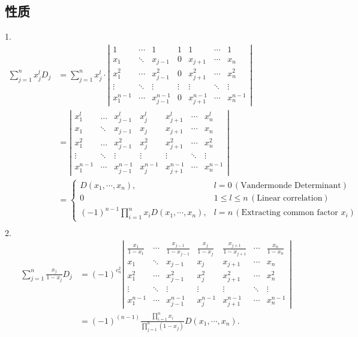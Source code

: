 \subsection{性质}
1.
\[\begin{aligned}
    \sum_{j=1}^n x_j^{l} D_j &=\sum_{j=1}^n x_j^{l} \cdot\left|\begin{array}{ccccccc}
    1 & \cdots & 1 & 1 & 1 & \cdots & 1 \\
    x_1 & \ddots & x_{j-1} & 0 & x_{j+1} & \cdots & x_n \\
    x_1^2 & \cdots & x_{j-1}^2 & 0 & x_{j+1}^2 & \cdots & x_n^2 \\
    \vdots & \ddots & \vdots & \vdots & \vdots & \ddots & \vdots \\
    x_1^{n-1} & \cdots & x_{j-1}^{n-1} & 0 & x_{j+1}^{n-1} & \cdots & x_n^{n-1}
    \end{array}\right|\\
    &=\left|\begin{array}{ccccccc}
    x_1^l & \ldots & x_{j-1}^l & x_j^l & x_{j+1}^l & \cdots & x_n^l \\
    x_1 & \ddots & x_{j-1} & x_j & x_{j+1} & \cdots & x_n \\
    x_1^2 & \ldots & x_{j-1}^2 & x_j^2 & x_{j+1}^2 & \cdots & x_n^2 \\
    \vdots & \ddots & \vdots & \vdots & \vdots & \ddots & \vdots \\
    x_1^{n-1} & \cdots & x_{j-1}^{n-1} & x_j^{n-1} & x_{j+1}^{n-1} & \cdots & x_n^{n-1}
    \end{array}\right| \\
    & =\left\{\begin{array}{ll}
    D\left(x_1, \cdots, x_n\right), & l=0 \,(\text{Vandermonde Determinant})\\
    0 & 1 \leq l \leq n \,(\text{Linear correlation})\\
    (-1)^{n-1} \prod_{i=1}^n x_i D\left(x_1, \cdots, x_n\right), & l=n \,(\text{Extracting common factor $x_i$})
    \end{array}\right. \\
    &
    \end{aligned}\]
2.
\[\begin{aligned}\sum_{j=1}^n \frac{x_j}{1-x_j} D_j &=(-1)^{c_n^2}\left|\begin{array}{ccccccc}
    \frac{x_1}{1-x_1} & \cdots & \frac{x_{j-1}}{1-x_{j-1}} & \frac{x_j}{1-x_j} & \frac{x_{j+1}}{1-x_{j+1}} & \cdots & \frac{x_n}{1-x_n} \\
    x_1 & \ddots & x_{j-1} & x_j & x_{j+1} & \cdots & x_n \\
    x_1^2 & \cdots & x_{j-1}^2 & x_j^2 & x_{j+1}^2 & \cdots & x_n^2 \\
    \vdots & \ddots & \vdots & \vdots & \vdots & \ddots & \vdots \\
    x_1^{n-1} & \cdots & x_{j-1}^{n-1} & x_j^{n-1} & x_{j+1}^{n-1} & \cdots & x_n^{n-1}
    \end{array}\right|\\
    &=(-1)^{(n-1)} \frac{\prod_{i=1}^n x_i}{\prod_{j=1}^n\left(1-x_j\right)} D\left(x_1, \cdots, x_n\right) .
\end{aligned}\]
